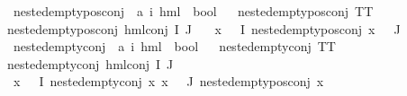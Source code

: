 \begin{isabellebody}
\isanewline
{}\isamarkupfalse%
\ nested{\isacharunderscore}{\kern0pt}empty{\isacharunderscore}{\kern0pt}pos{\isacharunderscore}{\kern0pt}conj\ {\isacharcolon}{\kern0pt}{\isacharcolon}{\kern0pt}\ {\isachardoublequoteopen}{\isacharparenleft}{\kern0pt}{\isacharprime}{\kern0pt}a{\isacharcomma}{\kern0pt}\ {\isacharprime}{\kern0pt}i{\isacharparenright}{\kern0pt}\ hml\ {\isasymRightarrow}\ bool{\isachardoublequoteclose}\isanewline
\ \ \isanewline
{\isachardoublequoteopen}nested{\isacharunderscore}{\kern0pt}empty{\isacharunderscore}{\kern0pt}pos{\isacharunderscore}{\kern0pt}conj\ TT{\isachardoublequoteclose}\ {\isacharbar}{\kern0pt}\isanewline
{\isachardoublequoteopen}nested{\isacharunderscore}{\kern0pt}empty{\isacharunderscore}{\kern0pt}pos{\isacharunderscore}{\kern0pt}conj\ {\isacharparenleft}{\kern0pt}hml{\isacharunderscore}{\kern0pt}conj\ I\ J\ {\isasymPhi}{\isacharparenright}{\kern0pt}{\isachardoublequoteclose}\ \isanewline
{}\ {\isachardoublequoteopen}{\isasymforall}x\ {\isasymin}\ {\isacharparenleft}{\kern0pt}{\isasymPhi}\ {\isacharbackquote}{\kern0pt}I{\isacharparenright}{\kern0pt}{\isachardot}{\kern0pt}\ nested{\isacharunderscore}{\kern0pt}empty{\isacharunderscore}{\kern0pt}pos{\isacharunderscore}{\kern0pt}conj\ x{\isachardoublequoteclose}\ {\isachardoublequoteopen}{\isacharparenleft}{\kern0pt}{\isasymPhi}\ {\isacharbackquote}{\kern0pt}\ J{\isacharparenright}{\kern0pt}\ {\isacharequal}{\kern0pt}\ {\isacharbraceleft}{\kern0pt}{\isacharbraceright}{\kern0pt}{\isachardoublequoteclose}\isanewline
\isanewline
{}\isamarkupfalse%
\ nested{\isacharunderscore}{\kern0pt}empty{\isacharunderscore}{\kern0pt}conj\ {\isacharcolon}{\kern0pt}{\isacharcolon}{\kern0pt}\ {\isachardoublequoteopen}{\isacharparenleft}{\kern0pt}{\isacharprime}{\kern0pt}a{\isacharcomma}{\kern0pt}\ {\isacharprime}{\kern0pt}i{\isacharparenright}{\kern0pt}\ hml\ {\isasymRightarrow}\ bool{\isachardoublequoteclose}\isanewline
\ \ \isanewline
{\isachardoublequoteopen}nested{\isacharunderscore}{\kern0pt}empty{\isacharunderscore}{\kern0pt}conj\ TT{\isachardoublequoteclose}\ {\isacharbar}{\kern0pt}\isanewline
{\isachardoublequoteopen}nested{\isacharunderscore}{\kern0pt}empty{\isacharunderscore}{\kern0pt}conj\ {\isacharparenleft}{\kern0pt}hml{\isacharunderscore}{\kern0pt}conj\ I\ J\ {\isasymPhi}{\isacharparenright}{\kern0pt}{\isachardoublequoteclose}\isanewline
{}\ {\isachardoublequoteopen}{\isasymforall}x\ {\isasymin}\ {\isacharparenleft}{\kern0pt}{\isasymPhi}\ {\isacharbackquote}{\kern0pt}I{\isacharparenright}{\kern0pt}{\isachardot}{\kern0pt}\ nested{\isacharunderscore}{\kern0pt}empty{\isacharunderscore}{\kern0pt}conj\ x{\isachardoublequoteclose}\ {\isachardoublequoteopen}{\isasymforall}x\ {\isasymin}\ {\isacharparenleft}{\kern0pt}{\isasymPhi}\ {\isacharbackquote}{\kern0pt}J{\isacharparenright}{\kern0pt}{\isachardot}{\kern0pt}\ nested{\isacharunderscore}{\kern0pt}empty{\isacharunderscore}{\kern0pt}pos{\isacharunderscore}{\kern0pt}conj\ x{\isachardoublequoteclose}\isanewline

\end{isabellebody}
